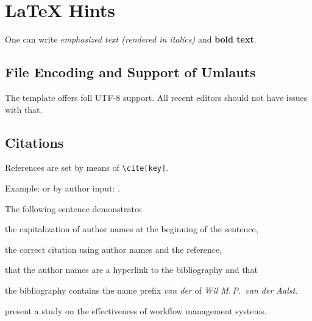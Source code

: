 
\chapter{LaTeX Hints}
\label{chap:latexhints}


One can write \emph{emphasized text (rendered in italics)} and \textbf{bold text}.

\section{File Encoding and Support of Umlauts}
\label{sec:firstsectioninlatexhints}
The template offers foll UTF-8 support.
All recent editors should not have issues with that.

\section{Citations}


References are set by means of \texttt{\textbackslash cite[key]}.

\begin{filecontents*}{\democodefile}
Example: \cite{WSPA} or by author input: \citet{WSPA}.
\end{filecontents*}

The following sentence demonstrates
\begin{inparaenum}[1.]
  \item the capitalization of author names at the beginning of the sentence,
  \item the correct citation using author names and the reference,
  \item that the author names are a hyperlink to the bibliography and that
  \item the bibliography contains the name prefix \textit{van der} of \textit{Wil M.\,P.\ van der Aalst}.
\end{inparaenum}

\begin{filecontents*}{\democodefile}
 present a study on the effectiveness of workflow management systems.
\end{filecontents*}

